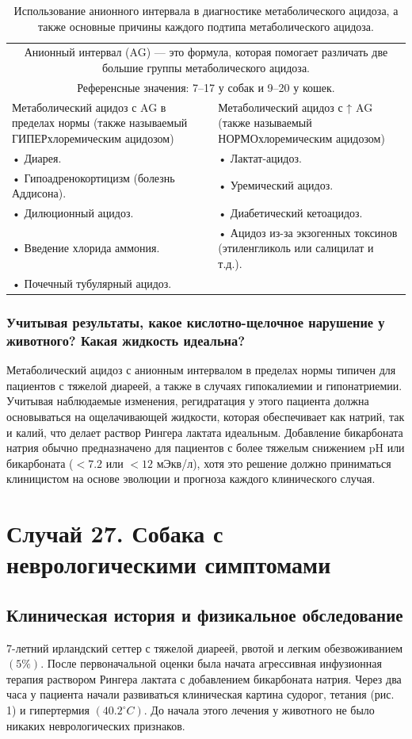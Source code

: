 \documentclass[a4paper,12pt]{book}
\begin{document}
\begin{table}[htbp]
\centering
\caption{Использование анионного интервала в диагностике метаболического ацидоза, а также основные причины каждого подтипа метаболического ацидоза.}
\begin{tabular}{p{7cm}p{7cm}}
\toprule
\multicolumn{2}{c}{Анионный интервал (AG) — это формула, которая помогает различать две большие группы метаболического ацидоза.} \\
\multicolumn{2}{c}{Референсные значения: 7--17 у собак и 9--20 у кошек.} \\
\midrule
Метаболический ацидоз с AG в пределах нормы (также называемый ГИПЕРхлоремическим ацидозом) & Метаболический ацидоз с ↑ AG (также называемый НОРМОхлоремическим ацидозом) \\
\midrule
• Диарея. & • Лактат-ацидоз. \\
• Гипоадренокортицизм (болезнь Аддисона). & • Уремический ацидоз. \\
• Дилюционный ацидоз. & • Диабетический кетоацидоз. \\
• Введение хлорида аммония. & • Ацидоз из-за экзогенных токсинов (этиленгликоль или салицилат и т.д.). \\
• Почечный тубулярный ацидоз. & \\
\bottomrule
\end{tabular}
\end{table}

\subsubsection*{Учитывая результаты, какое кислотно-щелочное нарушение у животного? Какая жидкость идеальна?}
Метаболический ацидоз с анионным интервалом в пределах нормы типичен для пациентов с тяжелой диареей, а также в случаях гипокалиемии и гипонатриемии. Учитывая наблюдаемые изменения, регидратация у этого пациента должна основываться на ощелачивающей жидкости, которая обеспечивает как натрий, так и калий, что делает раствор Рингера лактата идеальным. Добавление бикарбоната натрия обычно предназначено для пациентов с более тяжелым снижением pH или бикарбоната ($< 7.2$ или $< 12$ мЭкв/л), хотя это решение должно приниматься клиницистом на основе эволюции и прогноза каждого клинического случая.

\section{Случай 27. Собака с неврологическими симптомами}
\subsection*{Клиническая история и физикальное обследование}
7-летний ирландский сеттер с тяжелой диареей, рвотой и легким обезвоживанием $(5\%)$. После первоначальной оценки была начата агрессивная инфузионная терапия раствором Рингера лактата с добавлением бикарбоната натрия. Через два часа у пациента начали развиваться клиническая картина судорог, тетания (рис. 1) и гипертермия $(40.2^{\circ}C)$. До начала этого лечения у животного не было никаких неврологических признаков.
\end{document}
